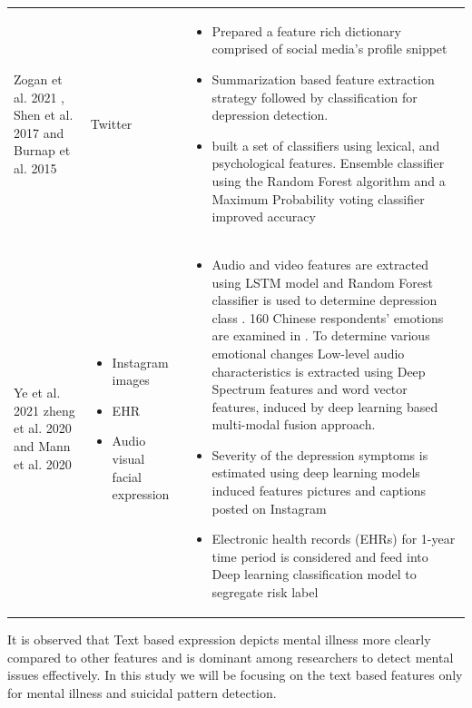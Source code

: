 \documentclass[sn-mathphys,Numbered]{sn-jnl}%
\theoremstyle{thmstyleone}%
\theoremstyle{thmstyletwo}%
\theoremstyle{thmstylethree}%
\begin{document}
\begin{table}[h!]
\begin{center}
\begin{flushleft}
\begin{tabular}{|p{2cm}|p{2cm}|p{8cm}|}
Zogan et al. 2021 \cite{zogan2021depressionnet}, Shen et al. 2017 \cite{shen2017depression} and Burnap et al. 2015  \cite{burnap2015machine}
& Twitter 
& 
\begin{itemize}
\item Prepared a feature rich dictionary comprised of social media's profile snippet \cite{shen2017depression}
\item Summarization based feature extraction strategy followed by classification for depression detection.\cite{zogan2021depressionnet}
\item built a set of classifiers using lexical, and psychological features. Ensemble classifier using the Random Forest algorithm and a Maximum Probability voting classifier improved accuracy  \cite{burnap2015machine}
\end{itemize} 
\\
Ye et al. 2021 \cite{ye2021multi} zheng et al. 2020 \cite{zheng2020development} and Mann et al. 2020 \cite{mann2020see} & 
\begin{itemize}
\item Instagram images \cite{mann2020see}
\item EHR \cite{zheng2020development}
\item Audio visual facial expression \cite{he2022deep, ye2021multi}
\end{itemize}
& \begin{itemize}
\item Audio and video features are extracted using LSTM model and Random Forest classifier is used to determine depression class \cite{he2022deep}. 160 Chinese respondents' emotions are examined in \cite{ye2021multi}. To determine various emotional changes Low-level audio characteristics is extracted using Deep Spectrum features and word vector features, induced by deep learning based multi-modal fusion approach. 
\item Severity of the depression symptoms is estimated using deep learning models induced features pictures and captions posted on Instagram \cite{mann2020see}
\item Electronic health records (EHRs) for 1-year time period is considered  and feed into Deep learning classification model to segregate risk label \cite{zheng2020development}
\end{itemize}

 \\
%

\bottomrule
\end{tabular}
\end{flushleft}
\end{center}
\end{table}
It is observed that Text based expression depicts mental illness more clearly compared to other features and is dominant among researchers to detect mental issues effectively. In this study we will be focusing on the text based features only for mental illness and suicidal pattern detection. 
  
\end{document}
